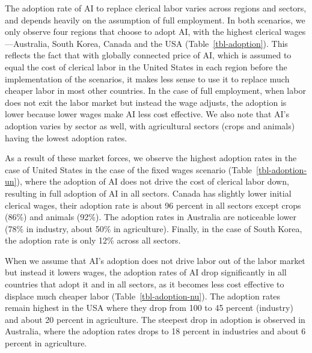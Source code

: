 \documentclass[
  authoryear,
  doubleblind]{elsarticle}
\begin{document}
The adoption rate of AI to replace clerical labor varies across regions
and sectors, and depends heavily on the assumption of full employment.
In both scenarios, we only observe four regions that choose to adopt AI,
with the highest clerical wages---Australia, South Korea, Canada and the
USA (Table~\ref{tbl-adoption}). This reflects the fact that with
globally connected price of AI, which is assumed to equal the cost of
clerical labor in the United States in each region before the
implementation of the scenarios, it makes less sense to use it to
replace much cheaper labor in most other countries. In the case of full
employment, when labor does not exit the labor market but instead the
wage adjusts, the adoption is lower because lower wages make AI less
cost effective. We also note that AI's adoption varies by sector as
well, with agricultural sectors (crops and animals) having the lowest
adoption rates.

As a result of these market forces, we observe the highest adoption
rates in the case of United States in the case of the fixed wages
scenario (Table~\ref{tbl-adoption-un}), where the adoption of AI does
not drive the cost of clerical labor down, resulting in full adoption of
AI in all sectors. Canada has slightly lower initial clerical wages,
their adoption rate is about 96 percent in all sectors except crops
(86\%) and animals (92\%). The adoption rates in Australia are
noticeable lower (78\% in industry, about 50\% in agriculture). Finally,
in the case of South Korea, the adoption rate is only 12\% across all
sectors.

When we assume that AI's adoption does not drive labor out of the labor
market but instead it lowers wages, the adoption rates of AI drop
significantly in all countries that adopt it and in all sectors, as it
becomes less cost effective to displace much cheaper labor
(Table~\ref{tbl-adoption-nu}). The adoption rates remain highest in the
USA where they drop from 100 to 45 percent (industry) and about 20
percent in agriculture. The steepest drop in adoption is observed in
Australia, where the adoption rates drops to 18 percent in industries
and about 6 percent in agriculture.
\end{document}

